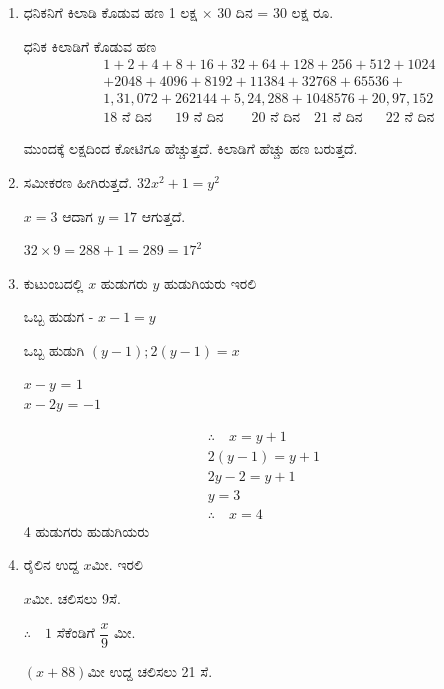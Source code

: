 \begin{enumerate}
\eject

\item ಧನಿಕನಿಗೆ ಕಿಲಾಡಿ ಕೊಡುವ ಹಣ 1 ಲಕ್ಷ $\times$ 30 ದಿನ  = 30 ಲಕ್ಷ ರೂ.

ಧನಿಕ ಕಿಲಾಡಿಗೆ ಕೊಡುವ ಹಣ 
\begin{align*}
& 1+2+4+8+16+32+64+128+256+512+1024\\
& +2048+4096+8192+11384+32768+65536+\\
& 1,31,072+262144+5,24,288+1048576+20,97,152\\
& {18 \text{ ನೆ ದಿನ}} ~~~\quad {19 \text{ ನೆ ದಿನ}}\qquad {20 \text{ ನೆ ದಿನ}}\quad{21 \text{ ನೆ ದಿನ}}~~~\quad{22 \text{ ನೆ ದಿನ}}
\end{align*}

ಮುಂದಕ್ಕೆ ಲಕ್ಷದಿಂದ ಕೋಟಿಗೂ ಹೆಚ್ಚುತ್ತದೆ. ಕಿಲಾಡಿಗೆ ಹೆಚ್ಚು ಹಣ ಬರುತ್ತದೆ. 

\item  ಸಮೀಕರಣ ಹೀಗಿರುತ್ತದೆ. $32x^{2} + 1 = y^{2}$

$x=3$ ಆದಾಗ $y=17$ ಆಗುತ್ತದೆ. 

$32\times 9 = 288 + 1 = 289 = 17^{2}$

\item ಕುಟುಂಬದಲ್ಲಿ $x$ ಹುಡುಗರು $y$ ಹುಡುಗಿಯರು ಇರಲಿ 

ಒಬ್ಬ ಹುಡುಗ - $x - 1 = y$

ಒಬ್ಬ ಹುಡುಗಿ $(y - 1); 2(y - 1) = x$
\begin{tabbing}
$x - y$  =  $1$\\
$x - 2y$ =  $-1$
\end{tabbing}

\vskip -2cm

\begin{gather*}
\therefore\quad x  = y + 1\\
2(y - 1)  = y + 1\\
2y - 2  = y + 1\\
y  = 3\\
\therefore\quad x  = 4
\end{gather*}
4 ಹುಡುಗರು ಹುಡುಗಿಯರು 

\item ರೈಲಿನ ಉದ್ದ $x$ಮೀ. ಇರಲಿ 

\vskip 0.1cm

$x$ಮೀ. ಚಲಿಸಲು 9ಸೆ. 

\vskip 0.1cm

$\therefore\quad 1$ ಸೆಕೆಂಡಿಗೆ $\dfrac{x}{9}$ ಮೀ. 

\vskip 0.1cm

$(x+88)$ಮೀ ಉದ್ದ ಚಲಿಸಲು 21 ಸೆ. 

\eject


\end{enumerate}
